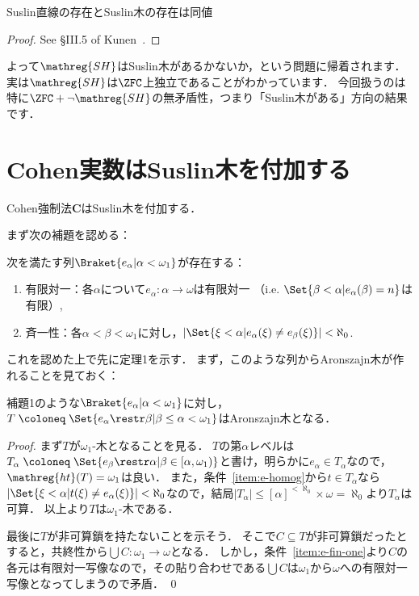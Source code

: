 \documentclass[a4j]{ltjsarticle}
\renewcommand{\defeq}{\mathrel{\coloneq}}
\newcommand{\SH}{\mathreg{SH}}
\begin{document}
\begin{fact}
 Suslin直線の存在とSuslin木の存在は同値
\end{fact}
\begin{proof}
 See \S III.5 of Kunen~\cite{Kunen:2011}.
\end{proof}

よって$\SH$はSuslin木があるかないか，という問題に帰着されます．
実は$\SH$は$\ZFC$上独立であることがわかっています．
今回扱うのは特に$\ZFC+\neg \SH$の無矛盾性，つまり「Suslin木がある」方向の結果です．

\section{Cohen実数はSuslin木を付加する}

\begin{theorem}
 Cohen強制法$\mathbf{C}$はSuslin木を付加する．
\end{theorem}

まず次の補題を認める：

\begin{lemma}
 次を満たす列$\Braket{e_\alpha | \alpha < \omega_1}$が存在する：
 \begin{enumerate}
  \item \label{item:e-fin-one}有限対一：各$\alpha$について$e_\alpha : \alpha \to \omega$は有限対一
        （i.e. $\Set{ \beta < \alpha | e_\alpha(\beta) = n }$は有限）,
  \item \label{item:e-homog}斉一性：各$\alpha < \beta < \omega_1$に対し，$\left|\Set{\xi < \alpha | e_\alpha(\xi) \neq e_\beta(\xi)}\right| < \aleph_0$.
 \end{enumerate}
\end{lemma}

これを認めた上で先に定理1を示す．
まず，このような列からAronszajn木が作れることを見ておく：

\begin{lemma}
 補題1のような$\Braket{e_\alpha | \alpha < \omega_1}$に対し，$T \defeq \Set{e_\alpha \restr \beta | \beta \leq \alpha < \omega_1}$はAronszajn木となる．
\end{lemma}
\begin{proof}
 まず$T$が$\omega_1$-木となることを見る．
 $T$の第$\alpha$レベルは$T_\alpha \defeq \Set{ e_\beta \restr \alpha | \beta \in [\alpha, \omega_1)}$と書け，明らかに$e_\alpha \in T_\alpha$なので，$\mathop{\mathreg{ht}}(T) = \omega_1$は良い．
 また，条件~\ref{item:e-homog}から$t \in T_\alpha$なら$|\Set{\xi < \alpha | t(\xi) \neq e_\alpha(\xi)}| < \aleph_0$なので，結局$|T_\alpha| \leq [\alpha]^{<\aleph_0} \times \omega = \aleph_0$より$T_\alpha$は可算．
 以上より$T$は$\omega_1$-木である．

 最後に$T$が非可算鎖を持たないことを示そう．
 そこで$C \subseteq T$が非可算鎖だったとすると，共終性から$\bigcup C: \omega_1 \to \omega$となる．
 しかし，条件~\ref{item:e-fin-one}より$C$の各元は有限対一写像なので，その貼り合わせである$\bigcup C$は$\omega_1$から$\omega$への有限対一写像となってしまうので矛盾． \qed
\end{proof}
\end{document}
